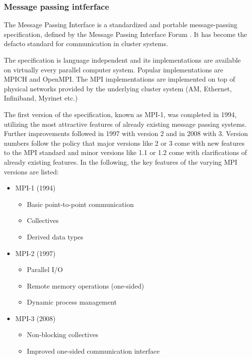 \subsubsection{Message passing intferface }
\label{sec:mpi}
The Message Passing Interface is a standardized and portable
message-passing specification, defined by the Message Passing
Interface Forum \cite{ref:mpi_specification}. It has become the
defacto standard for communication in cluster systems.

The specification is language independent and its implementations are
available on virtually every parallel computer system.  Popular
implementations are MPICH and OpenMPI.  The MPI implementations are
implemented on top of physical networks provided by the underlying
cluster system (AM, Ethernet, Infiniband, Myrinet etc.)

The first version of the specification, known as MPI-1, was completed
in 1994, utilizing the most attractive features of already
existing message passing systems.  Further improvements followed in 1997
with version 2 and in 2008 with 3. Version numbers follow
the policy that major versions like 2 or 3 come with new
features to the MPI standard and minor versions like 1.1 or
1.2 come with clarifications of already existing features. In
the following, the key features of the varying MPI versions are listed:

\begin{itemize}
  \item MPI-1 (1994)
    \begin{itemize}
      \item Basic point-to-point communication
      \item Collectives
      \item Derived data types
    \end{itemize}
  \item MPI-2 (1997)
    \begin{itemize}
      \item Parallel I/O
      \item Remote memory operations (one-sided)
      \item Dynamic process management
    \end{itemize}
  \item MPI-3 (2008)
    \begin{itemize}
      \item Non-blocking collectives
      \item Improved one-sided communication interface
    \end{itemize}
\end{itemize}

